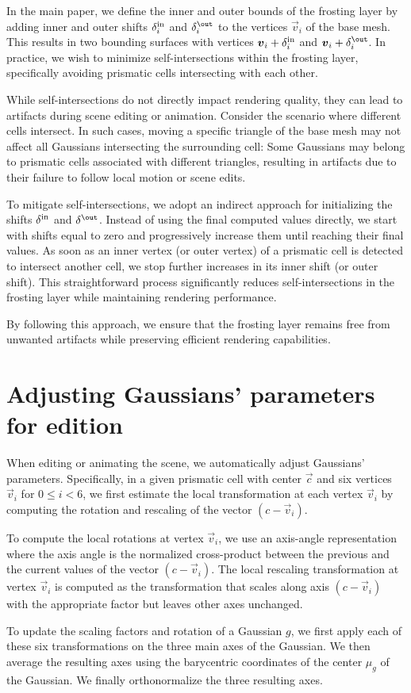 In the main paper, we define the inner and outer bounds of the frosting layer by adding inner and outer shifts $\delta^{\text{in}}_i$ and $\outershift_i$ to the vertices $\vec{v}_i$ of the base mesh. This results in two bounding surfaces with vertices $\vec{v}_i + \innershift_i$ and $\vec{v}_i + \outershift_i$. 
%
In practice, we wish to minimize self-intersections within the frosting layer, specifically avoiding prismatic cells intersecting with each other.

While self-intersections do not directly impact rendering quality, they can lead to artifacts during scene editing or animation. Consider the scenario where different cells intersect. In such cases, moving a specific triangle of the base mesh may not affect all Gaussians intersecting the surrounding cell: Some Gaussians may belong to prismatic cells associated with different triangles, resulting in artifacts due to their failure to follow local motion or scene edits.

To mitigate self-intersections, we adopt an indirect approach for initializing the shifts $\delta^{\text{in}}$ and $\outershift$. 
Instead of using the final computed values directly, we start with shifts equal to zero and progressively increase them until reaching their final values. 
As soon as an inner vertex (or outer vertex) of a prismatic cell is detected to intersect another cell, we stop further increases in its inner shift (or outer shift). 
This straightforward process significantly reduces self-intersections in the frosting layer while maintaining rendering performance.

By following this approach, we ensure that the frosting layer remains free from unwanted artifacts while preserving efficient rendering capabilities.

\section{Adjusting Gaussians' parameters for edition}

When editing or animating the scene, we automatically adjust Gaussians' parameters. Specifically, in a given prismatic cell with center $\vec{c}$ and six vertices $\vec{v}_i$ for $0\leq i<6$, we first estimate the local transformation at each vertex $\vec{v}_i$ by computing the rotation and rescaling of the vector $(c - \vec{v}_i)$. 

To compute the local rotations at vertex $\vec{v}_i$, we use an axis-angle representation where the axis angle is the normalized cross-product between the previous and the current values of the vector $(c - \vec{v}_i)$.
%
The local rescaling transformation at vertex $\vec{v}_i$ is computed as the transformation that scales along axis $(c - \vec{v}_i)$ with the appropriate factor but leaves other axes unchanged.

To update the scaling factors and rotation of a Gaussian $g$, we first apply each of these six transformations on the three main axes of the Gaussian. We then average the resulting axes using the barycentric coordinates of the center $\mu_g$ of the Gaussian. We finally orthonormalize the three resulting axes.
